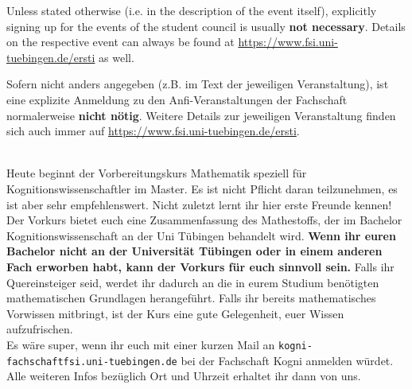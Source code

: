 \setlength{\fboxrule}{4pt}
\begin{description}
  \ifml
    \item[Note:] Unless stated otherwise (i.e. in the description of the event itself), explicitly signing up for the events of the student council is usually \textbf{not necessary}. Details on the respective event can always be found at \url{https://www.fsi.uni-tuebingen.de/ersti} as well.
  \else
    \item[Hinweis:] Sofern nicht anders angegeben (z.B. im Text der jeweiligen Veranstaltung), ist eine explizite Anmeldung zu den Anfi-Veranstaltungen der Fachschaft normalerweise \textbf{nicht nötig}. Weitere Details zur jeweiligen Veranstaltung finden sich auch immer auf \url{https://www.fsi.uni-tuebingen.de/ersti}.
  \fi

\ifkogwiss
    \ifmaster
        \item[Montag, 30. September \YEAR, 09:00 Uhr, Ort TBA ]\ \\
        Heute beginnt der Vorbereitungskurs Mathematik speziell für Kognitionswissenschaftler im Master. Es ist nicht Pflicht daran teilzunehmen, es ist aber sehr empfehlenswert. Nicht zuletzt lernt ihr hier erste Freunde kennen! Der Vorkurs bietet euch eine Zusammenfassung des Mathestoffs, der im Bachelor Kognitionswissenschaft an der Uni Tübingen behandelt wird.
        \textbf{Wenn ihr euren Bachelor nicht an der Universität Tübingen oder in einem anderen Fach erworben habt, kann der Vorkurs für euch sinnvoll sein.} Falls ihr Quereinsteiger seid, werdet ihr dadurch an die in eurem Studium benötigten mathematischen Grundlagen herangeführt. Falls ihr bereits mathematisches Vorwissen mitbringt, ist der Kurs eine gute Gelegenheit, euer Wissen aufzufrischen.\\
         Es wäre super, wenn ihr euch mit einer kurzen Mail an \texttt{kogni-fachschaft\At fsi.uni-tuebingen.de} bei der Fachschaft Kogni anmelden würdet. Alle weiteren Infos bezüglich Ort und Uhrzeit erhaltet ihr dann von uns.\\


\end{description}
